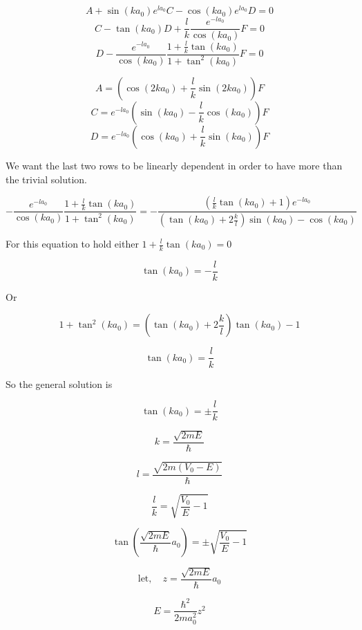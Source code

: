 \documentclass[12pt]{article}
\begin{document}
\begin{enumerate}
          \[
              A + \sin{(k a_0)}e^{l a_0} C - \cos{(k a_0)}e^{l a_0} D = 0
          \]
          \[
              C - \tan{(k a_0)}D + \frac{l}{k}  \frac{e^{- l a_0}}{\cos{(k a_0)}}F = 0
          \]
          \[
              D - \frac{e^{-l a_0}}{\cos{(k a_0)}}\frac{1 + \frac{l}{k} \tan{(k a_0)}}{1 + \tan^2{(k a_0)}} F = 0
          \]

          \[
              A = (\cos{(2 k a_0)} + \frac{l}{k} \sin{(2 k a_0)}) F
          \]
          \[
              C = e^{-l a_0} (\sin{(k a_0)} - \frac{l}{k} \cos{(k a_0)}) F
          \]
          \[
              D = e^{-l a_0} (\cos{(k a_0)} + \frac{l}{k} \sin{(k a_0)}) F
          \]

          We want the last two rows to be linearly dependent in order to have more than the trivial solution.

          \[
              - \frac{e^{-l a_0}}{\cos{(k a_0)}}\frac{1 + \frac{l}{k} \tan{(k a_0)}}{1 + \tan^2{(k a_0)}} = - \frac{(\frac{l}{k} \tan{(k a_0)} + 1) e^{- l a_0}}{(\tan{(k a_0)} + 2 \frac{k}{l}) \sin{(k a_0)} - \cos{(k a_0)}}
          \]

          For this equation to hold either \(1 + \frac{l}{k} \tan{(k a_0)} = 0\)

          \[
              \tan{(k a_0)} = - \frac{l}{k}
          \]

          Or

          \[
              1 + \tan^2{(k a_0)} = (\tan{(k a_0)} + 2 \frac{k}{l}) \tan{(k a_0)} - 1
          \]

          \[
              \tan{(k a_0)} = \frac{l}{k}
          \]

          So the general solution is

          \[
              \tan{(k a_0)} = \pm \frac{l}{k}
          \]

          \[
              k = \frac{\sqrt{2m E}}{\hbar}
          \]

          \[
              l = \frac{\sqrt{2m (V_0 - E)}}{\hbar}
          \]

          \[
              \frac{l}{k} = \sqrt{\frac{V_0}{E} - 1}
          \]

          \[
              \tan{(\frac{\sqrt{2m E}}{\hbar} a_0)} = \pm \sqrt{\frac{V_0}{E} - 1}
          \]

          \[
              \text{let},\quad z = \frac{\sqrt{2m E}}{\hbar} a_0
          \]

          \[
              E = \frac{{\hbar^2}}{2ma_0^2} z^2
          \]


\end{enumerate}
\end{document}
